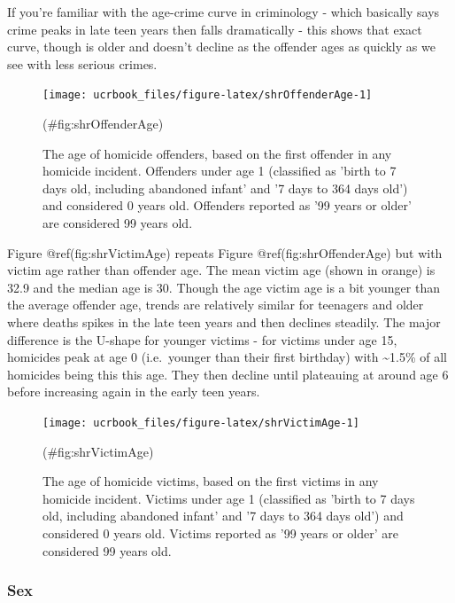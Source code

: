 \documentclass[
  12pt,
  openany]{book}
\begin{document}
If you're familiar with the age-crime curve in criminology - which basically says crime peaks in late teen years then falls dramatically - this shows that exact curve, though is older and doesn't decline as the offender ages as quickly as we see with less serious crimes.

\begin{figure}

{\centering \texttt{[image: ucrbook\_files/figure-latex/shrOffenderAge-1]} 

}

\caption{The age of homicide offenders, based on the first offender in any homicide incident. Offenders under age 1 (classified as 'birth to 7 days old, including abandoned infant' and '7 days to 364 days old') and considered 0 years old. Offenders reported as '99 years or older' are considered 99 years old.}(\#fig:shrOffenderAge)
\end{figure}

Figure @ref(fig:shrVictimAge) repeats Figure @ref(fig:shrOffenderAge) but with victim age rather than offender age. The mean victim age (shown in orange) is 32.9 and the median age is 30. Though the age victim age is a bit younger than the average offender age, trends are relatively similar for teenagers and older where deaths spikes in the late teen years and then declines steadily. The major difference is the U-shape for younger victims - for victims under age 15, homicides peak at age 0 (i.e.~younger than their first birthday) with \textasciitilde1.5\% of all homicides being this this age. They then decline until plateauing at around age 6 before increasing again in the early teen years.

\begin{figure}

{\centering \texttt{[image: ucrbook\_files/figure-latex/shrVictimAge-1]} 

}

\caption{The age of homicide victims, based on the first victims in any homicide incident. Victims under age 1 (classified as 'birth to 7 days old, including abandoned infant' and '7 days to 364 days old') and considered 0 years old. Victims reported as '99 years or older' are considered 99 years old.}(\#fig:shrVictimAge)
\end{figure}

\hypertarget{sex}{%
\subsubsection{Sex}\label{sex}}
\end{document}
